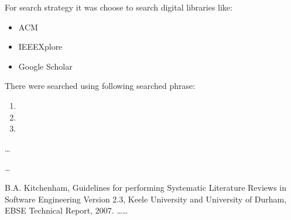 \documentclass[times, 10pt,twocolumn]{article}
\begin{document}

For search strategy it was choose to search digital libraries like:
\begin{itemize}
	\item ACM
	\item IEEEXplore
	\item Google Scholar
\end{itemize}

There were searched using following searched phrase:
\begin{enumerate}
	\item 
	\item
	\item
\end{enumerate}



\ldots


\ldots


\noindent [1] B.A. Kitchenham, Guidelines for performing Systematic Literature Reviews in Software Engineering Version 2.3, Keele University and University of Durham, EBSE Technical Report, 2007. \newline
[2] \ldots \newline
[3] \ldots

\nocite{ex1,ex2}
 

\end{document}
